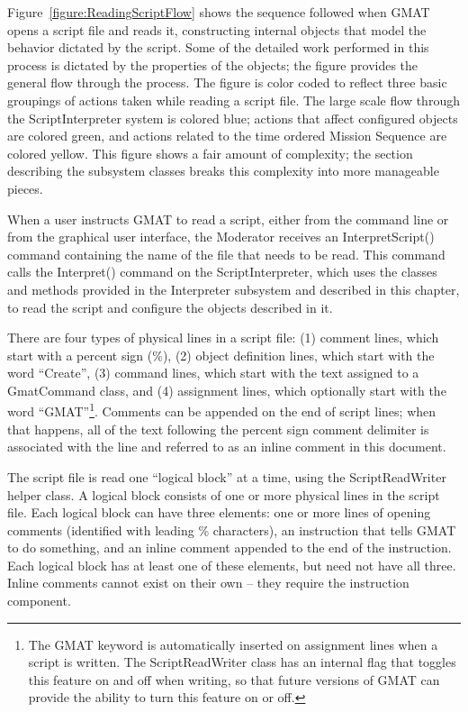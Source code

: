 Figure~\ref{figure:ReadingScriptFlow} shows the sequence followed when GMAT opens a script file and
reads it, constructing internal objects that model the behavior dictated by the script.  Some of the
detailed work performed in this process is dictated by the properties of the objects; the figure
provides the general flow through the process.  The figure is color coded to reflect three basic
groupings of actions taken while reading a script file.  The large scale flow through the
ScriptInterpreter system is colored blue; actions that affect configured objects are colored green,
and actions related to the time ordered Mission Sequence are colored yellow.  This figure shows a
fair amount of complexity; the section describing the subsystem classes breaks this complexity into
more manageable pieces.

When a user instructs GMAT to read a script, either from the command line or from the graphical
user interface, the Moderator receives an InterpretScript() command containing the name of the file
that needs to be read.  This command calls the Interpret() command on the ScriptInterpreter, which
uses the classes and methods provided in the Interpreter subsystem and described in this chapter,
to read the script and configure the objects described in it.

There are four types of physical lines in a script file: (1) comment lines, which start with a
percent sign (\%), (2) object definition lines, which start with the word ``Create'', (3) command
lines, which start with the text assigned to a GmatCommand class, and (4) assignment lines, which
optionally start with the word ``GMAT''\footnote{The GMAT keyword is automatically inserted on
assignment lines when a script is written.  The ScriptReadWriter class has an internal flag that
toggles this feature on and off when writing, so that future versions of GMAT can provide the
ability to turn this feature on or off.}. Comments can be appended on the end of script lines; when
that happens, all of the text following the percent sign comment delimiter is associated with the
line and referred to as an inline comment in this document.

The script file is read one ``logical block'' at a time, using the ScriptReadWriter helper class.  A
logical block consists of one or more physical lines in the script file.  Each logical block can
have three elements: one or more lines of opening comments (identified with leading \% characters),
an instruction that tells GMAT to do something, and an inline comment appended to the end of the
instruction.  Each logical block has at least one of these elements, but need not have all three.
Inline comments cannot exist on their own -- they require the instruction component.

